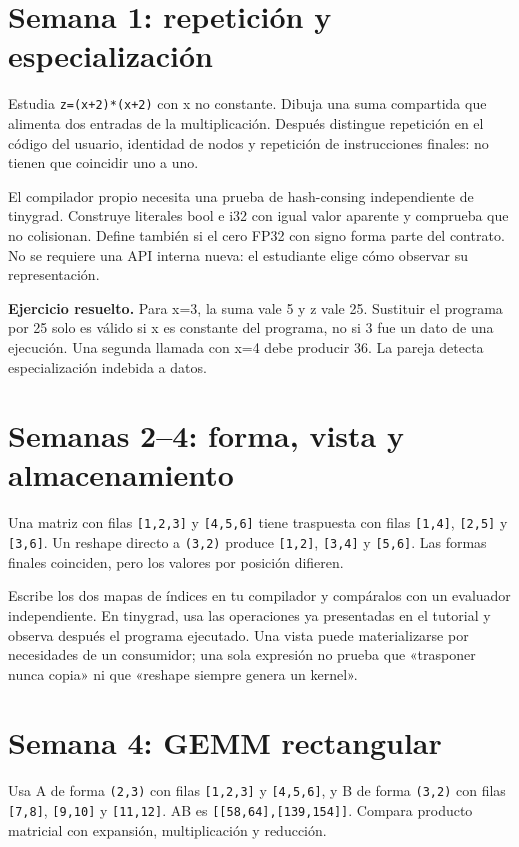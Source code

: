 \documentclass[12pt,a4paper,oneside]{report}
\begin{document}
\section{Semana 1: repetición y especialización}
Estudia \texttt{z=(x+2)*(x+2)} con x no constante. Dibuja una suma compartida que alimenta dos entradas de la multiplicación. Después distingue repetición en el código del usuario, identidad de nodos y repetición de instrucciones finales: no tienen que coincidir uno a uno.

El compilador propio necesita una prueba de hash-consing independiente de tinygrad. Construye literales bool e i32 con igual valor aparente y comprueba que no colisionan. Define también si el cero FP32 con signo forma parte del contrato. No se requiere una API interna nueva: el estudiante elige cómo observar su representación.

\textbf{Ejercicio resuelto.} Para x=3, la suma vale 5 y z vale 25. Sustituir el programa por 25 solo es válido si x es constante del programa, no si 3 fue un dato de una ejecución. Una segunda llamada con x=4 debe producir 36. La pareja detecta especialización indebida a datos.

\section{Semanas 2--4: forma, vista y almacenamiento}
Una matriz con filas \texttt{[1,2,3]} y \texttt{[4,5,6]} tiene traspuesta con filas \texttt{[1,4]}, \texttt{[2,5]} y \texttt{[3,6]}. Un reshape directo a \texttt{(3,2)} produce \texttt{[1,2]}, \texttt{[3,4]} y \texttt{[5,6]}. Las formas finales coinciden, pero los valores por posición difieren.

Escribe los dos mapas de índices en tu compilador y compáralos con un evaluador independiente. En tinygrad, usa las operaciones ya presentadas en el tutorial y observa después el programa ejecutado. Una vista puede materializarse por necesidades de un consumidor; una sola expresión no prueba que «trasponer nunca copia» ni que «reshape siempre genera un kernel».

\section{Semana 4: GEMM rectangular}
Usa A de forma \texttt{(2,3)} con filas \texttt{[1,2,3]} y \texttt{[4,5,6]}, y B de forma \texttt{(3,2)} con filas \texttt{[7,8]}, \texttt{[9,10]} y \texttt{[11,12]}. AB es \texttt{[[58,64],[139,154]]}. Compara producto matricial con expansión, multiplicación y reducción.
\end{document}
